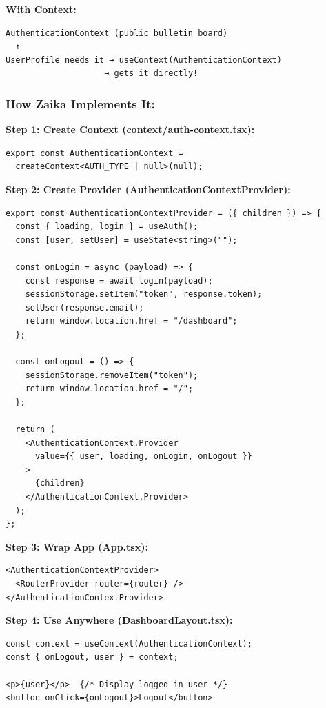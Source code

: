 \documentclass[12pt]{article}
\begin{document}
\textbf{With Context:}
\begin{lstlisting}
AuthenticationContext (public bulletin board)
  ↑ 
UserProfile needs it → useContext(AuthenticationContext) 
                    → gets it directly!
\end{lstlisting}

\subsubsection*{How Zaika Implements It:}

\textbf{Step 1: Create Context (context/auth-context.tsx):}

\begin{lstlisting}
export const AuthenticationContext = 
  createContext<AUTH_TYPE | null>(null);
\end{lstlisting}

\textbf{Step 2: Create Provider (AuthenticationContextProvider):}

\begin{lstlisting}
export const AuthenticationContextProvider = ({ children }) => {
  const { loading, login } = useAuth();
  const [user, setUser] = useState<string>("");
  
  const onLogin = async (payload) => {
    const response = await login(payload);
    sessionStorage.setItem("token", response.token);
    setUser(response.email);
    return window.location.href = "/dashboard";
  };
  
  const onLogout = () => {
    sessionStorage.removeItem("token");
    return window.location.href = "/";
  };
  
  return (
    <AuthenticationContext.Provider 
      value={{ user, loading, onLogin, onLogout }}
    >
      {children}
    </AuthenticationContext.Provider>
  );
};
\end{lstlisting}

\textbf{Step 3: Wrap App (App.tsx):}

\begin{lstlisting}
<AuthenticationContextProvider>
  <RouterProvider router={router} />
</AuthenticationContextProvider>
\end{lstlisting}

\textbf{Step 4: Use Anywhere (DashboardLayout.tsx):}

\begin{lstlisting}
const context = useContext(AuthenticationContext);
const { onLogout, user } = context;

<p>{user}</p>  {/* Display logged-in user */}
<button onClick={onLogout}>Logout</button>
\end{lstlisting}
\end{document}
